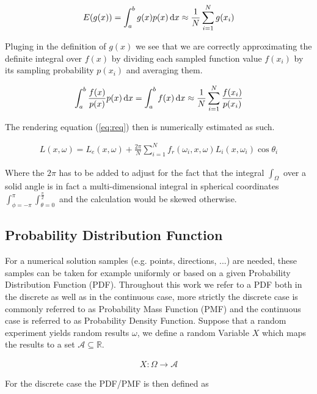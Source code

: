 \begin{align}
E(g(x)) = \int_a^b g(x)p(x)\mathop{}\!\mathrm{d} x \approx \frac{1}{N} \sum_{i=1}^{N} g(x_i) 
\end{align}

Pluging in the definition of $g(x)$ we see that we are correctly approximating the definite integral over $f(x)$ by dividing each sampled function value $f(x_i)$ by its sampling probability $p(x_i)$ and averaging them.

\begin{align}
\int_a^b \frac{f(x)}{p(x)}p(x)\mathop{}\!\mathrm{d} x = \int_a^b f(x) \mathop{}\!\mathrm{d} x \approx \frac{1}{N} \sum_{i=1}^{N} \frac{f(x_i)}{p(x_i)}
\end{align}


The rendering equation (\ref{eq:req}) then is numerically estimated as such.

\begin{align}
\label{eq:reqmc}
L(x, \omega) =  L_e(x, \omega) + \frac{2\pi}{N} \sum_{i=1}^{N} f_r(\omega_i, x, \omega) L_i(x, \omega_i)\cos\theta_i
\end{align}

Where the $2\pi$ has to be added to adjust for the fact that the integral $\int_\Omega$ over a solid angle is in fact a multi-dimensional integral in spherical coordinates $\int_{\phi = -\pi}^{\pi}\int_{\theta=0}^{\frac{\pi}{2}}$ and the calculation would be skewed otherwise. 

\subsection{Probability Distribution Function}
\label{sec:PDF}

For a numerical solution samples (e.g. points, directions, ...) are needed, these samples can be taken for example uniformly or based on a given Probability Distribution Function (PDF). Throughout this work we refer to a PDF both in the discrete as well as in the continuous case, more strictly the discrete case is commonly referred to as Probability Mass Function (PMF) and the continuous case is referred to as Probability Density Function. Suppose that a random experiment yields random results $\omega$, we define a random Variable $X$ which maps the results to a set $\mathcal{A} \subseteq \mathbb{R}$.

\begin{align}
X: \Omega \rightarrow \mathcal{A}
\end{align}

For the discrete case the PDF/PMF is then defined as

